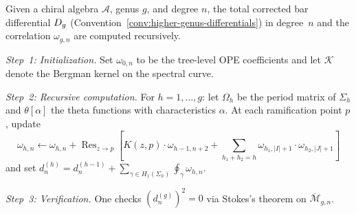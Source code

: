 \begin{construction}\label{con:higher-genus-bar}
Given a chiral algebra $\mathcal{A}$, genus $g$, and degree $n$, the total corrected bar differential $D_{g}$ \textup{(}Convention~\textup{\ref{conv:higher-genus-differentials})} in degree~$n$ and the correlation $\omega_{g,n}$ are computed recursively.

\emph{Step~1: Initialization.}
Set $\omega_{0,n}$ to be the tree-level OPE coefficients and let $\mathcal{K}$ denote the Bergman kernel on the spectral curve.

\emph{Step~2: Recursive computation.}
For $h = 1, \ldots, g$: let $\Omega_h$ be the period matrix of $\Sigma_h$ and $\theta[\alpha]$ the theta functions with characteristics $\alpha$.  At each ramification point $p$, update
\[\omega_{h,n} \leftarrow \omega_{h,n} + \operatorname{Res}_{z \to p}\!\left[K(z,p) \cdot \omega_{h-1,n+2} + \sum_{h_1+h_2=h} \omega_{h_1,|I|+1} \cdot \omega_{h_2,|J|+1}\right]\]
and set $d^{(h)}_n = d^{(h-1)}_n + \sum_{\gamma \in H_1(\Sigma_h)} \oint_\gamma \omega_{h,n}$.

\emph{Step~3: Verification.}
One checks $(d^{(g)}_n)^2 = 0$ via Stokes's theorem on $\overline{\mathcal{M}}_{g,n}$.
\end{construction}

